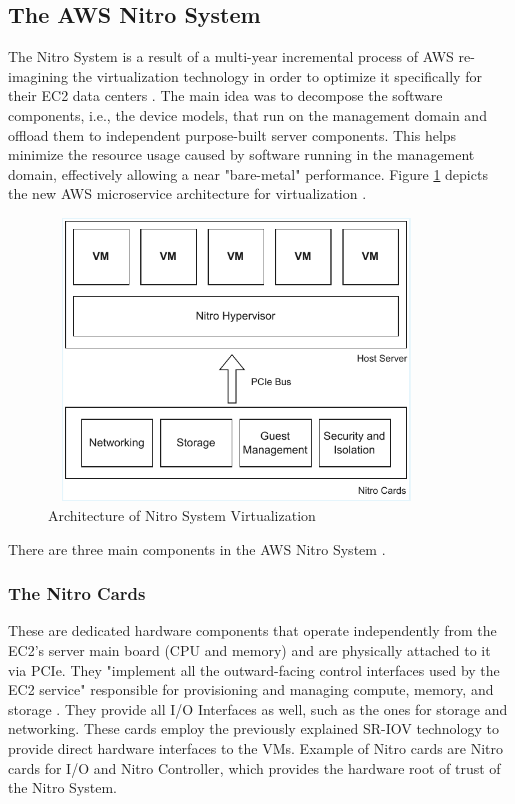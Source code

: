 \subsection{The AWS Nitro System}
The Nitro System is a result of a multi-year incremental process of AWS re-imagining the virtualization 
technology in order to optimize it specifically for their EC2 data centers \cite{nitro_whitepaper}. 
The main idea was to decompose the software components, i.e., the device models, 
that run on the management domain and offload them to independent purpose-built server components. 
This helps minimize the resource usage caused by software running in the management domain, effectively 
allowing a near "bare-metal" performance. Figure \ref{fig:nitro} depicts the new AWS microservice 
architecture for virtualization \cite{nitro_whitepaper}. 
\begin{figure}[H]
  \centering
  \includegraphics[width=10cm, height=7.5cm]{figures/nitro}
  \caption{Architecture of Nitro System Virtualization}
  \label{fig:nitro}
\end{figure}
\noindent
There are three main components in the AWS Nitro System \cite{nitro_whitepaper}. 
\subsubsection{The Nitro Cards}
These are dedicated hardware components that operate independently from the EC2's server main board 
(CPU and memory) and are physically attached to it via PCIe. They "implement all the outward-facing 
control interfaces used by the EC2 service" responsible for provisioning and managing compute, memory, 
and storage \cite{nitro_whitepaper}. They provide all I/O Interfaces as well, such 
as the ones for storage and networking. These cards employ the previously explained SR-IOV technology to 
provide direct hardware interfaces to the VMs. Example of Nitro cards are Nitro cards for I/O and 
Nitro Controller, which provides the hardware root of trust of the Nitro System. 

